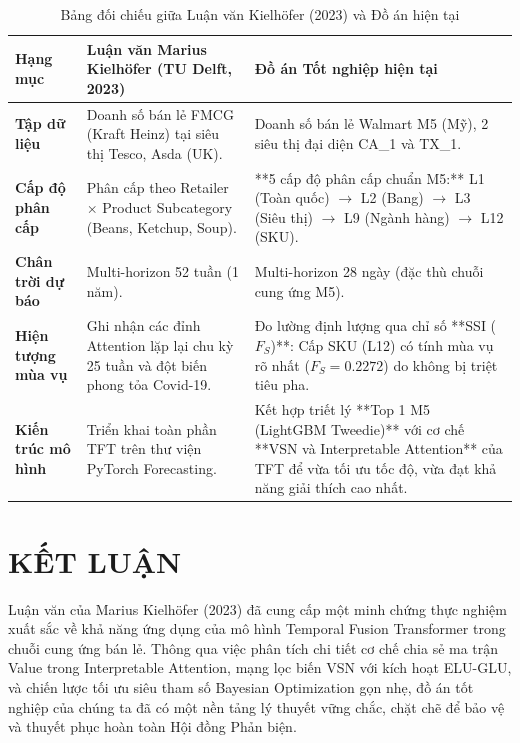 \documentclass[12pt,a4paper,oneside]{article}
\begin{document}
\begin{table}[htbp]
\centering
\small
\caption{Bảng đối chiếu giữa Luận văn Kielh\"{o}fer (2023) và Đồ án hiện tại}
\label{tab:doi_chieu_thuc_te}
\begin{tabularx}{\textwidth}{p{3.2cm} X X}
\toprule
\textbf{Hạng mục} & \textbf{Luận văn Marius Kielh\"{o}fer (TU Delft, 2023)} & \textbf{Đồ án Tốt nghiệp hiện tại} \\
\midrule
\textbf{Tập dữ liệu} & Doanh số bán lẻ FMCG (Kraft Heinz) tại siêu thị Tesco, Asda (UK). & Doanh số bán lẻ Walmart M5 (Mỹ), 2 siêu thị đại diện CA\_1 và TX\_1. \\
\addlinespace
\textbf{Cấp độ phân cấp} & Phân cấp theo Retailer $\times$ Product Subcategory (Beans, Ketchup, Soup). & **5 cấp độ phân cấp chuẩn M5:**\newline
L1 (Toàn quốc) $\rightarrow$ L2 (Bang) $\rightarrow$ L3 (Siêu thị) $\rightarrow$ L9 (Ngành hàng) $\rightarrow$ L12 (SKU). \\
\addlinespace
\textbf{Chân trời dự báo} & Multi-horizon 52 tuần (1 năm). & Multi-horizon 28 ngày (đặc thù chuỗi cung ứng M5). \\
\addlinespace
\textbf{Hiện tượng mùa vụ} & Ghi nhận các đỉnh Attention lặp lại chu kỳ 25 tuần và đột biến phong tỏa Covid-19. & Đo lường định lượng qua chỉ số **SSI ($F_S$)**: Cấp SKU (L12) có tính mùa vụ rõ nhất ($F_S = 0.2272$) do không bị triệt tiêu pha. \\
\addlinespace
\textbf{Kiến trúc mô hình} & Triển khai toàn phần TFT trên thư viện PyTorch Forecasting. & Kết hợp triết lý **Top 1 M5 (LightGBM Tweedie)** với cơ chế **VSN và Interpretable Attention** của TFT để vừa tối ưu tốc độ, vừa đạt khả năng giải thích cao nhất. \\
\bottomrule
\end{tabularx}
\end{table}

\section{KẾT LUẬN}
\label{sec:ket_luan}

Luận văn của Marius Kielh\"{o}fer (2023) đã cung cấp một minh chứng thực nghiệm xuất sắc về khả năng ứng dụng của mô hình Temporal Fusion Transformer trong chuỗi cung ứng bán lẻ. Thông qua việc phân tích chi tiết cơ chế chia sẻ ma trận Value trong Interpretable Attention, mạng lọc biến VSN với kích hoạt ELU-GLU, và chiến lược tối ưu siêu tham số Bayesian Optimization gọn nhẹ, đồ án tốt nghiệp của chúng ta đã có một nền tảng lý thuyết vững chắc, chặt chẽ để bảo vệ và thuyết phục hoàn toàn Hội đồng Phản biện.
\end{document}
